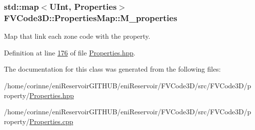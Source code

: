 \subsubsection[{\texorpdfstring{M\+\_\+properties}{M_properties}}]{\setlength{\rightskip}{0pt plus 5cm}std\+::map$<${\bf U\+Int}, {\bf Properties}$>$ F\+V\+Code3\+D\+::\+Properties\+Map\+::\+M\+\_\+properties\hspace{0.3cm}{\ttfamily [private]}}\hypertarget{classFVCode3D_1_1PropertiesMap_afdef5e8ebad216c3799c6ab0eb3a2ab5}{}\label{classFVCode3D_1_1PropertiesMap_afdef5e8ebad216c3799c6ab0eb3a2ab5}


Map that link each zone code with the property. 



Definition at line \hyperlink{Properties_8hpp_source_l00176}{176} of file \hyperlink{Properties_8hpp_source}{Properties.\+hpp}.



The documentation for this class was generated from the following files\+:\begin{DoxyCompactItemize}
\item 
/home/corinne/eni\+Reservoir\+G\+I\+T\+H\+U\+B/eni\+Reservoir/\+F\+V\+Code3\+D/src/\+F\+V\+Code3\+D/property/\hyperlink{Properties_8hpp}{Properties.\+hpp}\item 
/home/corinne/eni\+Reservoir\+G\+I\+T\+H\+U\+B/eni\+Reservoir/\+F\+V\+Code3\+D/src/\+F\+V\+Code3\+D/property/\hyperlink{Properties_8cpp}{Properties.\+cpp}\end{DoxyCompactItemize}
